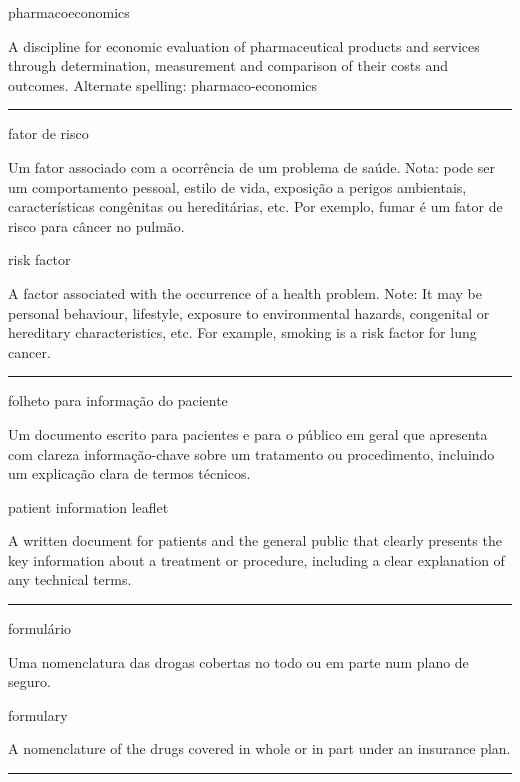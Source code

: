 \documentclass[
  openany]{book}
\begin{document}
pharmacoeconomics

A discipline for economic evaluation of pharmaceutical products and services through determination, measurement and comparison of their costs and outcomes. Alternate spelling: pharmaco-economics

\begin{center}\rule{0.5\linewidth}{0.5pt}\end{center}

fator de risco

Um fator associado com a ocorrência de um problema de saúde. Nota: pode ser um comportamento pessoal, estilo de vida, exposição a perigos ambientais, características congênitas ou hereditárias, etc. Por exemplo, fumar é um fator de risco para câncer no pulmão.

risk factor

A factor associated with the occurrence of a health problem. Note: It may be personal behaviour, lifestyle, exposure to environmental hazards, congenital or hereditary characteristics, etc. For example, smoking is a risk factor for lung cancer.

\begin{center}\rule{0.5\linewidth}{0.5pt}\end{center}

folheto para informação do paciente

Um documento escrito para pacientes e para o público em geral que apresenta com clareza informação-chave sobre um tratamento ou procedimento, incluindo um explicação clara de termos técnicos.

patient information leaflet

A written document for patients and the general public that clearly presents the key information about a treatment or procedure, including a clear explanation of any technical terms.

\begin{center}\rule{0.5\linewidth}{0.5pt}\end{center}

formulário

Uma nomenclatura das drogas cobertas no todo ou em parte num plano de seguro.

formulary

A nomenclature of the drugs covered in whole or in part under an insurance plan.

\begin{center}\rule{0.5\linewidth}{0.5pt}\end{center}
\end{document}
